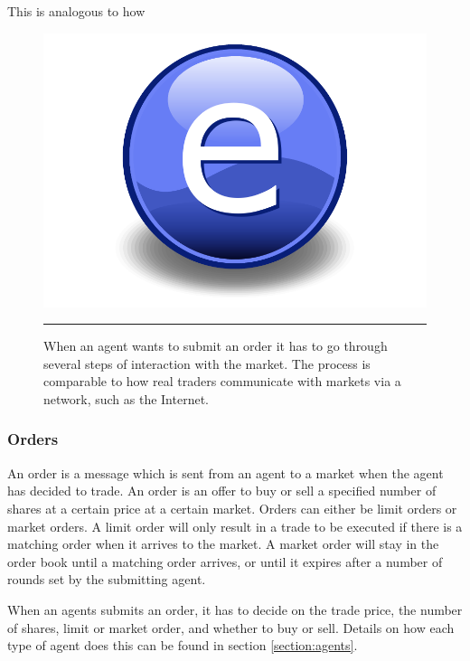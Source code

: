 This is analogous to how 
\begin{figure}[htbp]
	\centering
		\includegraphics{Figures/Electron.pdf}
		\rule{35em}{0.5pt}
	\caption{When an agent wants to submit an order it has to go through several steps of interaction with the market. The process is comparable to how real traders communicate with markets via a network, such as the Internet.}
	\label{fig:information_exchange}
\end{figure}

\subsubsection{Orders}
An order is a message which is sent from an agent to a market when the agent has decided to trade. An order is an offer to buy or sell a specified number of shares at a certain price at a certain market. Orders can either be limit orders or market orders. A limit order will only result in a trade to be executed if there is a matching order when it arrives to the market. A market order will stay in the order book until a matching order arrives, or until it expires after a number of rounds set by the submitting agent. 

When an agents submits an order, it has to decide on the trade price, the number of shares, limit or market order, and whether to buy or sell. Details on how each type of agent does this can be found in section \ref{section:agents}.




